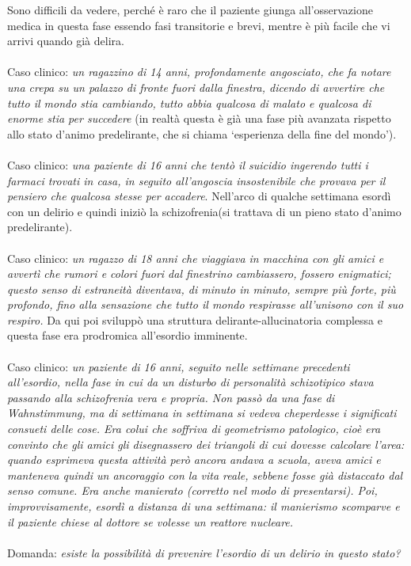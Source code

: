 Sono difficili da vedere, perché è raro che il paziente giunga
all'osservazione medica in questa fase essendo fasi transitorie e brevi,
mentre è più facile che vi arrivi quando già delira.
\\\\
Caso clinico: \emph{un ragazzino di 14 anni, profondamente angosciato,
che fa notare una crepa su un palazzo di fronte fuori dalla finestra,
dicendo di avvertire che tutto il mondo stia cambiando, tutto abbia
qualcosa di malato e qualcosa di enorme stia per succedere} (in realtà
questa è già una fase più avanzata rispetto allo stato d'animo
predelirante, che si chiama `esperienza della fine del mondo').
\\\\
Caso clinico: \emph{una paziente di 16 anni che tentò il suicidio
ingerendo tutti i farmaci trovati in casa, in seguito all'angoscia
insostenibile che provava per il pensiero che qualcosa stesse per
accadere}. Nell'arco di qualche settimana esordì con un delirio e quindi
iniziò la schizofrenia(si trattava di un pieno stato d'animo
predelirante).
\\\\
Caso clinico: \emph{un ragazzo di 18 anni che viaggiava in macchina con
gli amici e avvertì che rumori e colori fuori dal finestrino
cambiassero, fossero enigmatici; questo senso di estraneità diventava,
di minuto in minuto, sempre più forte, più profondo, fino alla
sensazione che tutto il mondo respirasse all'unisono con il suo
respiro.} Da qui poi sviluppò una struttura delirante-allucinatoria
complessa e questa fase era prodromica all'esordio imminente.
\\\\
Caso clinico: \emph{un paziente di 16 anni, seguito nelle settimane
precedenti all'esordio, nella fase in cui da un disturbo di personalità
schizotipico stava passando alla schizofrenia vera e propria. Non passò
da una fase di Wahnstimmung, ma di settimana in settimana si vedeva
cheperdesse i significati consueti delle cose. Era colui che soffriva di
geometrismo patologico, cioè era convinto che gli amici gli disegnassero
dei triangoli di cui dovesse calcolare l'area: quando esprimeva questa
attività però ancora andava a scuola, aveva amici e manteneva quindi un
ancoraggio con la vita reale, sebbene fosse già distaccato dal senso
comune. Era anche manierato (corretto nel modo di presentarsi). Poi,
improvvisamente, esordì a distanza di una settimana: il manierismo
scomparve e il paziente chiese al dottore se volesse un reattore
nucleare.}
\\\\
Domanda: \emph{esiste la possibilità di prevenire l'esordio di un
delirio in questo stato? }

